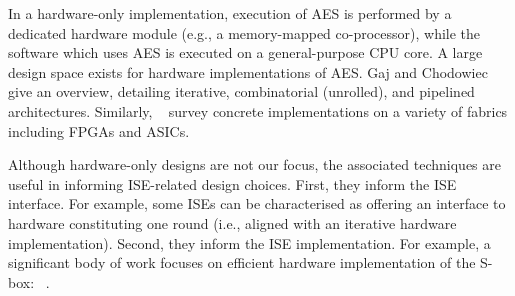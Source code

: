 
In a hardware-only implementation,
execution of 
AES
is 
performed by 
a dedicated hardware module (e.g., a memory-mapped co-processor),
while
the software which uses AES is executed on
a general-purpose CPU core.
A large design space exists for hardware implementations of AES.
Gaj and Chodowiec~\cite[Section 3.3]{GajCho:00}
give an overview, detailing
iterative,
combinatorial (unrolled),
and
pipelined architectures.
Similarly, ~\cite{PMDW:04,GooBen:05,GajCho:09}
survey concrete implementations on a variety of fabrics including FPGAs
and ASICs.

Although hardware-only designs are not our focus, the associated techniques
are useful in informing ISE-related design choices.
First,
they inform the ISE interface.
For example, some ISEs can be characterised as offering an interface to
hardware constituting one round 
(i.e., aligned with an iterative hardware implementation).
Second,
they inform the ISE implementation.
For example, a significant body of work focuses on efficient hardware 
implementation of the S-box: ~\cite{Canright:05,BoyPer:12,ReyTahAsh:18}.

